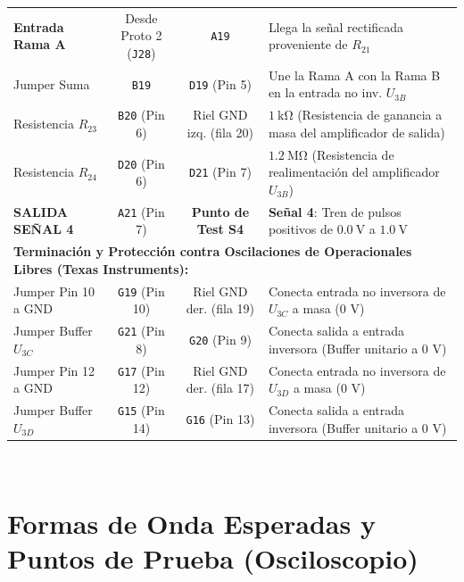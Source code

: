 \documentclass[10pt, a4paper]{article}
\begin{document}
\begin{center}
\begin{tabularx}{\textwidth}{l c c X}
\midrule
\textbf{Entrada Rama A} & Desde Proto 2 (\texttt{J28}) & \texttt{A19} & Llega la señal rectificada proveniente de $R_{21}$ \\
\rowcolor{softgray} Jumper Suma & \texttt{B19} & \texttt{D19} (Pin 5) & Une la Rama A con la Rama B en la entrada no inv. $U_{3B}$ \\
Resistencia $R_{23}$ & \texttt{B20} (Pin 6) & Riel GND izq. (fila 20) & $\SI{1}{\kilo\ohm}$ (Resistencia de ganancia a masa del amplificador de salida) \\
\rowcolor{softgray} Resistencia $R_{24}$ & \texttt{D20} (Pin 6) & \texttt{D21} (Pin 7) & $\SI{1.2}{\mega\ohm}$ (Resistencia de realimentación del amplificador $U_{3B}$) \\
\rowcolor{darkred!15} \textbf{SALIDA SEÑAL 4} & \texttt{A21} (Pin 7) & \textbf{Punto de Test S4} & \textbf{Señal 4}: Tren de pulsos positivos de $\SI{0.0}{\volt}$ a $\SI{+1.0}{\volt}$ \\
\midrule
\multicolumn{4}{l}{\textbf{Terminación y Protección contra Oscilaciones de Operacionales Libres (Texas Instruments):}} \\
\rowcolor{softgray} Jumper Pin 10 a GND & \texttt{G19} (Pin 10) & Riel GND der. (fila 19) & Conecta entrada no inversora de $U_{3C}$ a masa ($0\text{ V}$) \\
Jumper Buffer $U_{3C}$ & \texttt{G21} (Pin 8) & \texttt{G20} (Pin 9) & Conecta salida a entrada inversora (Buffer unitario a $0\text{ V}$) \\
\rowcolor{softgray} Jumper Pin 12 a GND & \texttt{G17} (Pin 12) & Riel GND der. (fila 17) & Conecta entrada no inversora de $U_{3D}$ a masa ($0\text{ V}$) \\
Jumper Buffer $U_{3D}$ & \texttt{G15} (Pin 14) & \texttt{G16} (Pin 13) & Conecta salida a entrada inversora (Buffer unitario a $0\text{ V}$) \\
\bottomrule
\end{tabularx}\\[4pt]
\end{center}

\newpage

\section{Formas de Onda Esperadas y Puntos de Prueba (Osciloscopio)}
\end{document}
